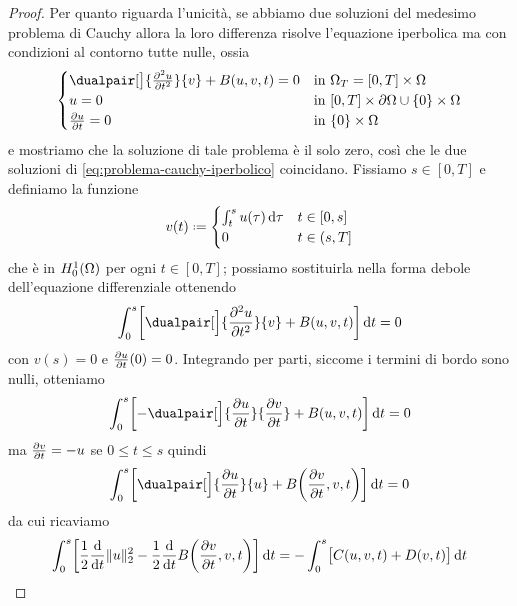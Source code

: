 \begin{proof}
    Per quanto riguarda l'unicità, se abbiamo due soluzioni del medesimo problema di Cauchy allora la loro differenza risolve l'equazione iperbolica ma con condizioni al contorno tutte nulle, ossia
    \begin{equation}
        \begin{cases}
            \dualpair[\big]{\ddrp{u}{t}}{v}+B(u,v,t)=0 & \text{in }\Omega_T=[0,T]\times\Omega\\
            u=0                                        & \text{in }[0,T]\times\boundary\Omega\cup\{0\}\times\Omega\\
            \drp{u}{t}=0                               & \text{in }\{0\}\times\Omega
        \end{cases}
    \end{equation}
    e mostriamo che la soluzione di tale problema è il solo zero, cos\`i che le due soluzioni di \eqref{eq:problema-cauchy-iperbolico} coincidano.
    Fissiamo $s\in[0,T]$ e definiamo la funzione
    \begin{equation}
        v(t)\defeq
        \begin{cases}
            \int_t^su(\tau)\,\dd\tau & t\in[0,s]\\
            0                        & t\in(s,T]
        \end{cases}
    \end{equation}
    che è in $\sobHc[1]{\Omega}$ per ogni $t\in[0,T]$; possiamo sostituirla nella forma debole dell'equazione differenziale ottenendo
    \begin{equation}
        \int_0^s\biggl[\dualpair[\Big]{\ddrp{u}{t}}{v}+B(u,v,t)\biggr]\,\dd t=0
    \end{equation}
    con $v(s)=0$ e $\drp{u}{t}(0)=0$.
    Integrando per parti, siccome i termini di bordo sono nulli, otteniamo
    \begin{equation}
        \int_0^s\biggl[-\dualpair[\Big]{\drp{u}{t}}{\drp{v}{t}}+B(u,v,t)\biggr]\,\dd t=0
    \end{equation}
    ma $\drp{v}{t}=-u$ se $0\le t\le s$ quindi
    \begin{equation}
        \int_0^s\biggl[\dualpair[\Big]{\drp{u}{t}}{u}+B\biggl(\drp{v}{t},v,t\biggr)\biggr]\,\dd t=0
    \end{equation}
    da cui ricaviamo
    \begin{equation}
        \int_0^s\biggl[\frac12\drv{}{t}\norm{u}_2^2-\frac12\drv{}{t}B\biggl(\drp{v}{t},v,t\biggr)\biggr]\,\dd t=
        -\int_0^s\bigl[C(u,v,t)+D(v,t)\bigr]\,\dd t
    \end{equation}

\end{proof}
